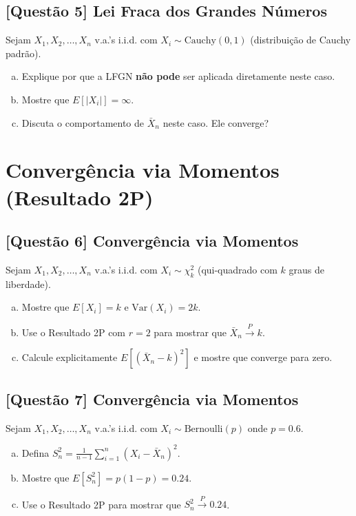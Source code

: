 \documentclass[12pt,a4paper]{article}
\begin{document}
\subsection*{[Questão 5] Lei Fraca dos Grandes Números}

Sejam $X_1, X_2, \ldots, X_n$ v.a.'s i.i.d. com $X_i \sim \text{Cauchy}(0, 1)$ (distribuição de Cauchy padrão).

\begin{enumerate}[(a)]
    \item Explique por que a LFGN \textbf{não pode} ser aplicada diretamente neste caso.
    \item Mostre que $E[|X_i|] = \infty$.
    \item Discuta o comportamento de $\bar{X}_n$ neste caso. Ele converge?
\end{enumerate}

\section{Convergência via Momentos (Resultado 2P)}

\subsection*{[Questão 6] Convergência via Momentos}

Sejam $X_1, X_2, \ldots, X_n$ v.a.'s i.i.d. com $X_i \sim \chi^2_k$ (qui-quadrado com $k$ graus de liberdade).

\begin{enumerate}[(a)]
    \item Mostre que $E[X_i] = k$ e $\text{Var}(X_i) = 2k$.
    \item Use o Resultado 2P com $r = 2$ para mostrar que $\bar{X}_n \xrightarrow{P} k$.
    \item Calcule explicitamente $E[(\bar{X}_n - k)^2]$ e mostre que converge para zero.
\end{enumerate}

\subsection*{[Questão 7] Convergência via Momentos}

Sejam $X_1, X_2, \ldots, X_n$ v.a.'s i.i.d. com $X_i \sim \text{Bernoulli}(p)$ onde $p = 0.6$.

\begin{enumerate}[(a)]
    \item Defina $S_n^2 = \frac{1}{n-1}\sum_{i=1}^n (X_i - \bar{X}_n)^2$.
    \item Mostre que $E[S_n^2] = p(1-p) = 0.24$.
    \item Use o Resultado 2P para mostrar que $S_n^2 \xrightarrow{P} 0.24$.
\end{enumerate}
\end{document}
